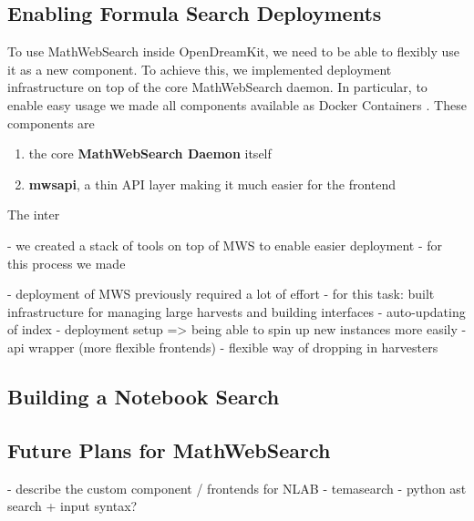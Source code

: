 \subsection{Enabling Formula Search Deployments}

To use MathWebSearch inside OpenDreamKit, we need to be able to flexibly use it as a new component. 
To achieve this, we implemented deployment infrastructure on top of the core MathWebSearch daemon. 
In particular, to enable easy usage we made all components available as Docker Containers . 
These components are

\begin{enumerate}
    \item the core \textbf{MathWebSearch Daemon} itself 
    \item \textbf{mwsapi}, a thin API layer making it much easier for the frontend
\end{enumerate}

The inter

- we created a stack of tools on top of MWS to enable easier deployment
- for this process we made

- deployment of MWS previously required a lot of effort
- for this task: built infrastructure for managing large harvests and building interfaces
    - auto-updating of index
    - deployment setup => being able to spin up new instances more easily
    - api wrapper (more flexible frontends)
    - flexible way of dropping in harvesters

\subsection{Building a Notebook Search}


\subsection{Future Plans for MathWebSearch}

- describe the custom component / frontends for NLAB
- temasearch
- python ast search + input syntax?

